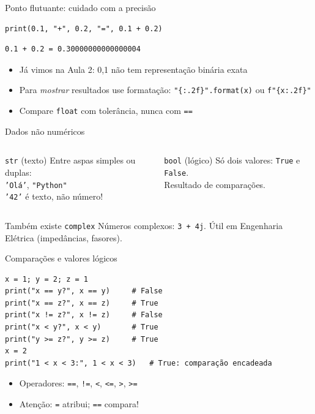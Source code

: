 \documentclass[aspectratio=169,10pt,t]{beamer}
\begin{document}
\begin{frame}[fragile]{Ponto flutuante: cuidado com a precisão}
\begin{lstlisting}
print(0.1, "+", 0.2, "=", 0.1 + 0.2)
\end{lstlisting}
\begin{lstlisting}[style=saida]
0.1 + 0.2 = 0.30000000000000004
\end{lstlisting}
  \begin{itemize}
    \item Já vimos na Aula 2: 0,1 não tem representação binária exata
    \item Para \emph{mostrar} resultados use formatação: \texttt{"\{:.2f\}".format(x)} ou \texttt{f"\{x:.2f\}"}
    \item Compare \texttt{float} com tolerância, nunca com \texttt{==}
  \end{itemize}
\end{frame}

\begin{frame}{Dados não numéricos}
  \begin{columns}[T]
    \begin{block}{\texttt{str} (texto)}
      Entre aspas simples ou duplas:\\
      \texttt{'Olá'}, \texttt{"Python"}\\
      \texttt{'42'} é texto, não número!
    \end{block}
    \begin{block}{\texttt{bool} (lógico)}
      Só dois valores: \texttt{True} e \texttt{False}.\\
      Resultado de comparações.
    \end{block}
  \end{columns}
  \vspace{1ex}
  \begin{exampleblock}{Também existe \texttt{complex}}
    Números complexos: \texttt{3 + 4j}. Útil em Engenharia Elétrica (impedâncias, fasores).
  \end{exampleblock}
\end{frame}

\begin{frame}[fragile]{Comparações e valores lógicos}
\begin{lstlisting}
x = 1; y = 2; z = 1
print("x == y?", x == y)     # False
print("x == z?", x == z)     # True
print("x != z?", x != z)     # False
print("x < y?", x < y)       # True
print("y >= z?", y >= z)     # True
x = 2
print("1 < x < 3:", 1 < x < 3)   # True: comparação encadeada
\end{lstlisting}
  \begin{itemize}
    \item Operadores: \texttt{==}, \texttt{!=}, \texttt{<}, \texttt{<=}, \texttt{>}, \texttt{>=}
    \item Atenção: \texttt{=} atribui; \texttt{==} compara!
  \end{itemize}
\end{frame}
\end{document}

